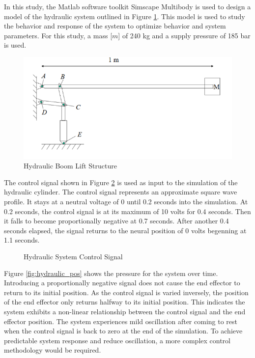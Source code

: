 In this study, the Matlab software toolkit Simscape Multibody is used to design a model of the hydraulic system outlined in Figure \ref{fig:boom_structure}. This model is used to study the behavior and response of the system to optimize behavior and system parameters. For this study, a mass [$m$] of 240 kg and a supply pressure of 185 bar is used.

\begin{figure}[H]
    \includegraphics[width=\textwidth]{1_hydraulic_sim/BoomStructure.PNG}
    \caption{Hydraulic Boom Lift Structure}
    \label{fig:boom_structure}
\end{figure}


The control signal shown in Figure \ref{fig:hydraulic_cs} is used as input to the simulation of the hydraulic cylinder. The control signal represents an approximate square wave profile. It stays at a neutral voltage of 0 until 0.2 seconds into the simulation. At 0.2 seconds, the control signal is at its maximum of 10 volts for 0.4 seconds. Then it falls to become proportionally negative at 0.7 seconds. After another 0.4 seconds elapsed, the signal returns to the neural position of 0 volts begenning at 1.1 seconds. 

\begin{figure}[H]
    
    \caption{Hydraulic System Control Signal}
    \label{fig:hydraulic_cs}
\end{figure}

Figure \ref{fig:hydraulic_pos} shows the pressure for the system over time. Introducing a proportionally negative signal does not cause the end effector to return to its initial position. As the control signal is varied inversely, the position of the end effector only returns halfway to its initial position. This indicates the system exhibits a non-linear relationship between the control signal and the end effector position.    The system experiences mild oscillation after coming to rest when the control signal is back to zero at the end of the simulation. To achieve predictable system response and reduce oscillation, a more complex control methodology would be required.

